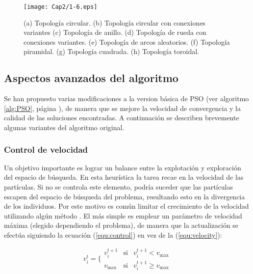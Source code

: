     \begin{figure}
	\centering
	\texttt{[image: Cap2/1-6.eps]}
	  \caption [Topolog\'ias de Vecindarios]{ (a) Topolog\'ia circular. (b) Topolog\'ia circular con conexiones variantes (c) Topolog\'ia de anillo. (d) Topolog\'ia
	  de rueda con conexiones variantes. (e) Topolog\'ia de arcos aleatorios. (f) Topolog\'ia piramidal. (g) Topolog\'ia cuadrada. 
	  (h) Topolog\'ia toroidal.}
      \label{fig:vecindarios}
      \end{figure}
    
    \subsection{Aspectos avanzados del algoritmo}
    
    Se han propuesto varias modificaciones a la version b\'asica de PSO (ver algoritmo \ref{alg:PSO}, p\'agina \pageref{alg:PSO}), de 
    manera que se mejore la velocidad de convergencia y la calidad de las soluciones encontradas. A continuaci\'on se describen brevemente 
    algunas variantes del algoritmo original.
    
    \subsubsection{Control de velocidad}
    
    Un objetivo importante es lograr un balance entre la explotaci\'on y exploraci\'on del espacio de b\'usqueda. En esta heur\'istica 
    la tarea recae en la velocidad de las part\'iculas. Si no se controla este elemento, podr\'ia suceder que las part\'iculas escapen 
    del espacio de b\'usqueda del problema, resultando esto en la divergencia de los individuos. Por este motivo es com\'un limitar el 
    crecimiento de la velocidad utilizando alg\'un m\'etodo \cite{Eberhart1996}. El m\'as simple es emplear un par\'ametro de velocidad m\'axima (elegido
    dependiendo el problema), de manera que la actualizaci\'on se efect\'ua  siguiendo la ecuaci\'on (\ref{equ:control}) en vez de la 
    (\ref{equ:velocity}):
    
    \begin{equation}
	v^t_i = \{
	\begin{matrix} 
	  v^{t+1}_i & \mbox{si}& v^{t+1}_i < v_{\max}\\
	  v_{\max} & \mbox{si}& v^{t+1}_i \geq v_{\max}
	\end{matrix}
    \label{equ:control}
    \end{equation}


